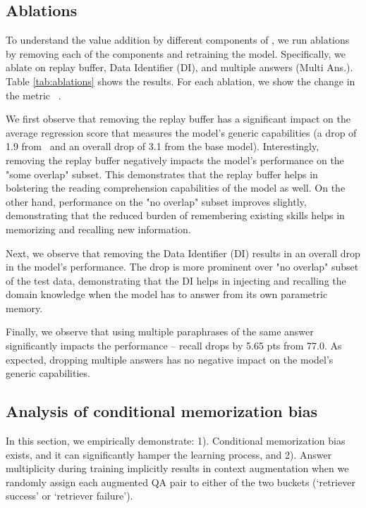
\subsection{Ablations} 
To understand the value addition by different components of \ourmethodshort, we run ablations by removing each of the components and retraining the model. 
Specifically, we ablate on replay buffer, Data Identifier (DI), and multiple answers (Multi Ans.).
Table \ref{tab:ablations} shows the results. For each ablation, we show the change in the metric \wrt\ \ourmethodshort.

We first observe that removing the replay buffer has a significant impact on the average regression score that measures the model's generic capabilities (a drop of 1.9 from \ourmethodshort\ and an overall drop of 3.1 from the base model).
Interestingly, removing the replay buffer negatively impacts the model's performance on the "some overlap" subset. 
This demonstrates that the replay buffer helps in bolstering the reading comprehension capabilities of the model as well.
On the other hand, performance on the "no overlap" subset improves slightly, demonstrating that the reduced burden of remembering existing skills helps in memorizing and recalling new information.

Next, we observe that removing the Data Identifier (DI) results in an overall drop in the model's performance.
The drop is more prominent over "no overlap" subset of the test data, demonstrating that the DI helps in injecting and recalling the domain knowledge when the model has to answer from its own parametric memory.

Finally, we observe that using multiple paraphrases of the same answer significantly impacts the performance -- recall drops by 5.65 pts from 77.0. As expected, dropping multiple answers has no negative impact on the model's generic capabilities. 


\subsection{Analysis of conditional memorization bias}
\label{subsec:analysis_of_biases}



In this section, we empirically demonstrate:
1). Conditional memorization bias exists, and it can significantly hamper the learning process, and
2). Answer multiplicity during training implicitly results in context augmentation when we randomly assign each augmented QA pair to either of the two buckets (`retriever success' or `retriever failure').

